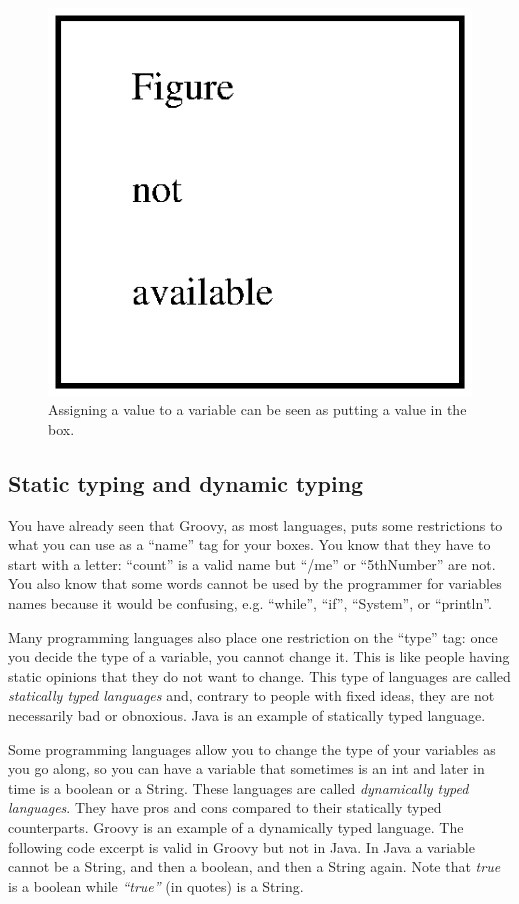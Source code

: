 \begin{figure}
  \centering
  \includegraphics{gfx/no_figure}
  \caption{Assigning a value to a variable can be seen as putting a
    value in the box.}
  \label{fig:var2}
\end{figure}

\subsection{Static typing and dynamic typing}
\label{sec:strong-typing-weak}

You have already seen that Groovy, as most languages, puts some
restrictions to what you can use as a ``name'' tag for your boxes. You
know that they have to start with a letter: ``count'' is a valid name
but ``/me'' or ``5thNumber'' are not. You also know that some words
cannot be used by the programmer for variables names because it would
be confusing, e.g. ``while'', ``if'', ``System'', or ``println''.

Many programming languages also place one restriction on the ``type''
tag: once you decide the type of a variable, you cannot change
it. This is like people having static opinions that they do not want
to change. This type of languages are called \emph{statically typed
  languages} and, contrary to people with fixed ideas, they are
not necessarily bad or obnoxious. Java is an example of
statically typed language. 

Some programming languages allow you to change the type of your
variables as you go along, so you can have a variable that sometimes
is an int and later in time is a boolean or a String. These languages
are called \emph{dynamically typed languages}. They have pros and cons
compared to their statically typed counterparts. Groovy is an example
of a dynamically typed language. The following code excerpt is valid
in Groovy but not in Java. In Java a variable cannot be a String, and
then a boolean, and then a String again. Note that \emph{true} is a
boolean while \emph{``true''} (in quotes) is a String. 

